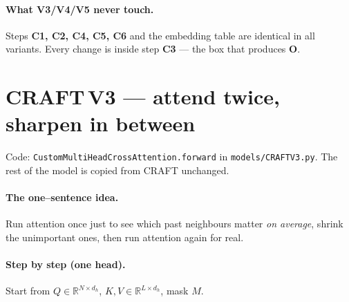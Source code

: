 \documentclass[11pt]{article}
\newcommand{\R}{\mathbb{R}}
\newcommand{\code}[1]{\texttt{\small #1}}
\begin{document}
\paragraph{What V3/V4/V5 never touch.} Steps \textbf{C1, C2, C4, C5, C6} and the
embedding table are identical in all variants. Every change is inside
step \textbf{C3} --- the box that produces $\bm{O}$.

\section{CRAFT\,V3 --- attend twice, sharpen in between}
\label{sec:v3}

Code: \code{CustomMultiHeadCrossAttention.forward} in \code{models/CRAFTV3.py}.
The rest of the model is copied from CRAFT unchanged.

\paragraph{The one--sentence idea.}
Run attention once just to see which past neighbours matter \emph{on average},
shrink the unimportant ones, then run attention again for real.

\paragraph{Step by step (one head).}
Start from $Q\in\R^{N\times d_h}$, $K,V\in\R^{L\times d_h}$, mask $M$.
\end{document}
